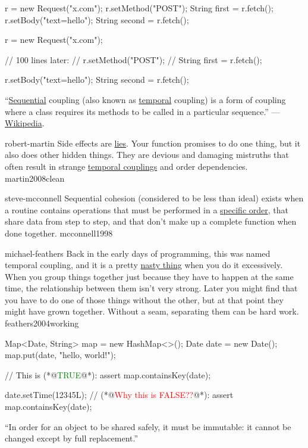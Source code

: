 \documentclass{article}
\begin{document}
\begin{pptWide}{2}
{\small\begin{ffcode}
r = new Request("x.com");
r.setMethod("POST");
String first = r.fetch();
r.setBody("text=hello");
String second = r.fetch();
\end{ffcode}
}
\par\columnbreak\par
{\small\begin{ffcode}
r = new Request("x.com");

// 100 lines later:
// r.setMethod("POST");
// String first = r.fetch();

r.setBody("text=hello");
String second = r.fetch();
\end{ffcode}
}
\end{pptWide}
\par
``\ul{Sequential} coupling (also known as \ul{temporal} coupling) is a form of coupling where a class requires its methods to be called in a particular sequence.'' --- \href{https://en.wikipedia.org/wiki/Sequential_coupling}{Wikipedia}.
\plush{}

\lnQuote
  {robert-martin}
  {Side effects are \ul{lies}. Your function promises to do one thing, but it also does other hidden things. They are devious and damaging mistruths that often result in strange \ul{temporal couplings} and order dependencies.}
  {martin2008clean}

\lnQuote
  {steve-mcconnell}
  {Sequential cohesion (considered to be less than ideal) exists when a routine contains operations that must be performed in a \ul{specific order}, that share data from step to step, and that don't make up a complete function when done together.}
  {mcconnell1998}

\lnQuote
  {michael-feathers}
  {Back in the early days of programming, this was named temporal coupling, and it is a pretty \ul{nasty thing} when you do it excessively. When you group things together just because they have to happen at the same time, the relationship between them isn’t very strong. Later you might find that you have to do one of those things without the other, but at that point they might have grown together. Without a seam, separating them can be hard work.}
  {feathers2004working}

\begin{pptWide}{2}
{\small\begin{ffcode}
Map<Date, String> map = new HashMap<>();
Date date = new Date();
map.put(date, "hello, world!");

// This is (*@\textcolor{green}{TRUE}@*):
assert map.containsKey(date);

date.setTime(12345L);
// (*@\textcolor{red}{Why this is FALSE??}@*):
assert map.containsKey(date);
\end{ffcode}
}
\par\columnbreak\par
``In order for an object to be shared safely, it must be immutable: it cannot be changed except by full replacement.''\par
{}
\end{pptWide}
\plush{}
\end{document}
